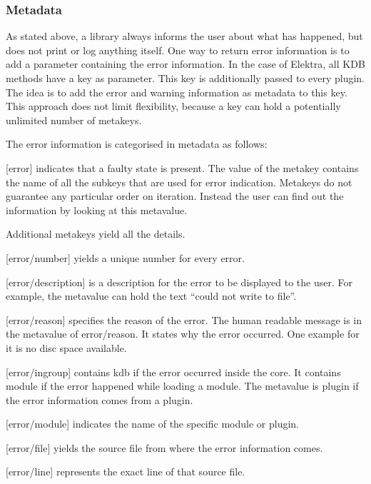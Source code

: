 \subsubsection*{Metadata}

As stated above, a library always informs the user about what has happened, but does not print or log anything itself. One way to return error information is to add a parameter containing the error information. In the case of Elektra, all {\ttfamily K\+DB} methods have a key as parameter. This key is additionally passed to every plugin. The idea is to add the error and warning information as metadata to this key. This approach does not limit flexibility, because a key can hold a potentially unlimited number of metakeys.

The error information is categorised in metadata as follows\+:


\begin{DoxyItemize}
\item \mbox{[}error\mbox{]} indicates that a faulty state is present. The value of the metakey contains the name of all the subkeys that are used for error indication. Metakeys do not guarantee any particular order on iteration. Instead the user can find out the information by looking at this metavalue.
\end{DoxyItemize}

Additional metakeys yield all the details.


\begin{DoxyItemize}
\item \mbox{[}error/number\mbox{]} yields a unique number for every error.
\item \mbox{[}error/description\mbox{]} is a description for the error to be displayed to the user. For example, the metavalue can hold the text “could not write to file”.
\item \mbox{[}error/reason\mbox{]} specifies the reason of the error. The human readable message is in the metavalue of {\ttfamily error/reason}. It states why the error occurred. One example for it is \textquotesingle{}\textquotesingle{}no disc space available\textquotesingle{}\textquotesingle{}.
\item \mbox{[}error/ingroup\mbox{]} contains {\ttfamily kdb} if the error occurred inside the core. It contains {\ttfamily module} if the error happened while loading a module. The metavalue is {\ttfamily plugin} if the error information comes from a plugin.
\item \mbox{[}error/module\mbox{]} indicates the name of the specific module or plugin.
\item \mbox{[}error/file\mbox{]} yields the source file from where the error information comes.
\item \mbox{[}error/line\mbox{]} represents the exact line of that source file.
\end{DoxyItemize}


